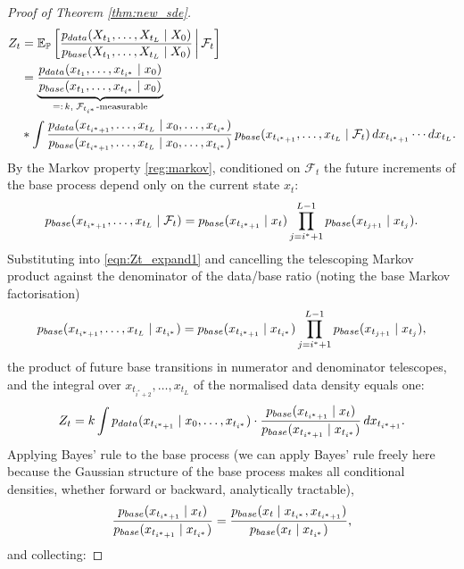 \documentclass{article}
\newcommand{\pdata}{p_{\normalfont{data}}}
\newcommand{\pbase}{p_{\normalfont{base}}}
\newcommand{\PP}{\mathbb{P}}
\newcommand{\EE}{\mathbb{E}}
\newcommand{\FF}{\mathcal{F}}
\begin{document}
\begin{proof}[Proof of Theorem \ref{thm:new_sde}]
\begin{align}
  Z_t
  &= \EE_\PP\left[
       \frac{\pdata(X_{t_1},\ldots,X_{t_L}\mid X_0)}
            {\pbase(X_{t_1},\ldots,X_{t_L}\mid X_0)}
       \,\bigg|\,\FF_t
     \right] \nonumber\\
  &= \underbrace{\frac{\pdata(x_{t_1},\ldots,x_{t_{i^*}}\mid x_0)}
                      {\pbase(x_{t_1},\ldots,x_{t_{i^*}}\mid x_0)}}_{=:\,k,\;\FF_{t_{i^*}}\text{-measurable}} \nonumber \\
     &*\int
       \frac{\pdata(x_{t_{i^*+1}},\ldots,x_{t_L}\mid x_0,\ldots,x_{t_{i^*}})}
            {\pbase(x_{t_{i^*+1}},\ldots,x_{t_L}\mid x_0,\ldots,x_{t_{i^*}})}
       \,\pbase(x_{t_{i^*+1}},\ldots,x_{t_L}\mid\FF_t)\,dx_{t_{i^*+1}}\cdots dx_{t_L}.
       \label{eqn:Zt_expand1}
\end{align}
By the Markov property \ref{reg:markov}, conditioned on $\FF_t$ the future increments
of the base process depend only on the current state $x_t$:
\[
  \pbase(x_{t_{i^*+1}},\ldots,x_{t_L}\mid\FF_t)
  = \pbase(x_{t_{i^*+1}}\mid x_t)\prod_{j=i^*+1}^{L-1}\pbase(x_{t_{j+1}}\mid x_{t_j}).
\]
Substituting into \eqref{eqn:Zt_expand1} and cancelling the telescoping Markov
product against the denominator of the data/base ratio (noting the base Markov
factorisation)
\begin{equation}\label{eqn:markov_factor}
  \pbase(x_{t_{i^*+1}},\ldots,x_{t_L}\mid x_{t_{i^*}})
  = \pbase(x_{t_{i^*+1}}\mid x_{t_{i^*}})\prod_{j=i^*+1}^{L-1}\pbase(x_{t_{j+1}}\mid x_{t_j}),
\end{equation}
the product of future base transitions in numerator and denominator telescopes, and
the integral over $x_{t_{i^*+2}},\ldots,x_{t_L}$ of the normalised data density equals one:
\begin{equation}\label{eqn:Zt_expand2}
  Z_t
  = k\int \pdata(x_{t_{i^*+1}}\mid x_0,\ldots,x_{t_{i^*}})
          \cdot\frac{\pbase(x_{t_{i^*+1}}\mid x_t)}{\pbase(x_{t_{i^*+1}}\mid x_{t_{i^*}})}
          \,dx_{t_{i^*+1}}.
\end{equation}
Applying Bayes' rule to the base process (we can apply Bayes' rule freely here because the Gaussian structure of the base process makes all conditional densities, whether forward or backward, analytically tractable),
\begin{equation}\label{eqn:bayes_base}
  \frac{\pbase(x_{t_{i^*+1}}\mid x_t)}{\pbase(x_{t_{i^*+1}}\mid x_{t_{i^*}})}
  = \frac{\pbase(x_t\mid x_{t_{i^*}},x_{t_{i^*+1}})}{\pbase(x_t\mid x_{t_{i^*}})},
\end{equation}
and collecting:

\end{proof}
\end{document}
